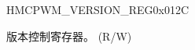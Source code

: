 \begin{register}{H}{MCPWM\_VERSION\_REG}{0x012C}\label{regdesc:MCPWMVERSIONREG}
%
%
\regnewline%
\begin{regdesc}\begin{reglist}
\label{fielddesc:MCPWMDATE}\item [MCPWM\_DATE] 版本控制寄存器。 (R/W)
\end{reglist}\end{regdesc}
\end{register}
